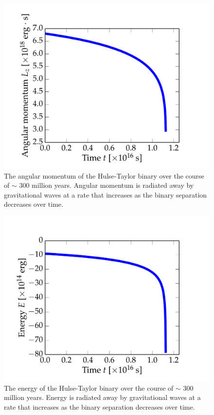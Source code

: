\documentclass[preprint2]{aastex}
\begin{document}
\begin{figure}[t!]
\vspace{-0.24cm}
\centering
\hspace*{-1cm}\includegraphics[width=1.2\textwidth]{billion_figs/angular_momentum.pdf}
\caption{The angular momentum of the Hulse-Taylor binary over the course of \(\sim\) 300 million years. Angular momentum is radiated away by gravitational waves at a rate that increases as the binary separation decreases over time.}
\label{billion-momentum}
\end{figure}

\begin{figure}[t!]
\vspace{-0.24cm}
\centering
\hspace*{-1cm}\includegraphics[width=1.2\textwidth]{billion_figs/energy.pdf}
\caption{The energy of the Hulse-Taylor binary over the course of \(\sim\) 300 million years. Energy is radiated away by gravitational waves at a rate that increases as the binary separation decreases over time.}
\label{billion-energy}
\end{figure}
\end{document}
